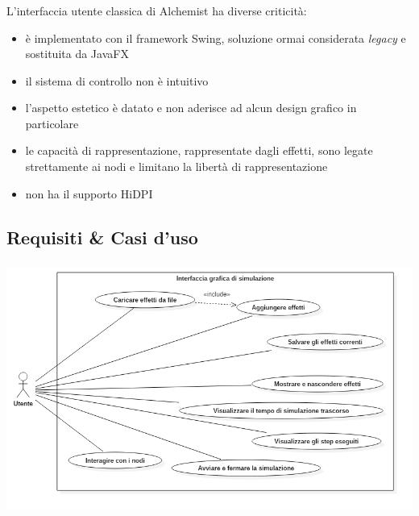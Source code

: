 \documentclass[%
]{beamer}
\newcommand{\engEmph}[1] {\emph{\foreignlanguage{english}#1}}
\begin{document}
            \begin{frame}
                \frametitle{\insertsection}
                \framesubtitle{\insertsubsection}
                L'interfaccia utente classica di Alchemist ha diverse criticità:

                \begin{itemize}[<+(1)->]
                    \item
                        è implementato con il framework Swing, soluzione ormai considerata \engEmph{legacy} e sostituita da JavaFX
                    \item
                        il sistema di controllo non è intuitivo
                    \item
                        l'aspetto estetico è datato e non aderisce ad alcun design grafico in particolare
                    \item
                        le capacità di rappresentazione, rappresentate dagli effetti, sono legate strettamente ai nodi e limitano la libertà di rappresentazione
                    \item
                        non ha il supporto HiDPI
                \end{itemize}
            \end{frame}

        \subsection{Requisiti \& Casi d'uso}\label{subsec:requisiti}
            \begin{frame}
                \frametitle{\insertsection}
                \framesubtitle{\insertsubsection}
                \centering
                \includegraphics[scale=0.40]{uml/useCaseBeamer}
            \end{frame}
\end{document}
